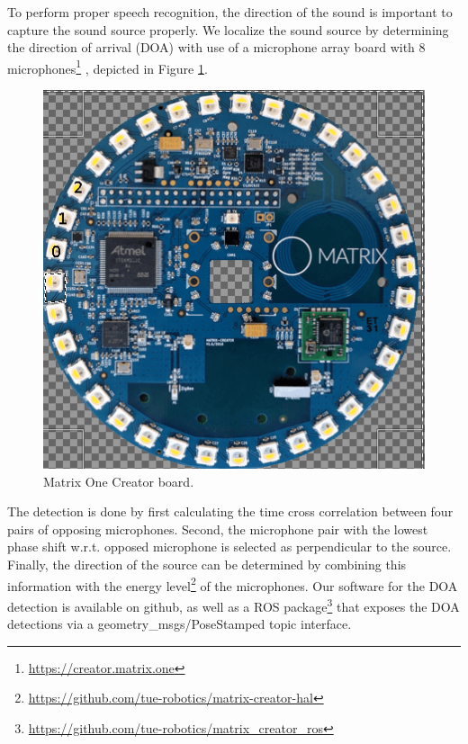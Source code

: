 To perform proper speech recognition, the direction of the sound is important to capture the sound source properly. We localize the sound source by determining the direction of arrival (DOA) with use of a microphone array board with 8 microphones\footnote{\url{https://creator.matrix.one}} , depicted in Figure \ref{fig:matrix_one}. 
\begin{figure}[h]
    \centering
	\includegraphics[width = 0.5\linewidth]{Figures/ssl_Matrix_creator.png}
	\caption{Matrix One Creator board.}
	\label{fig:matrix_one}
\end{figure}
The detection is done by first calculating the time cross correlation between four pairs of opposing microphones. Second, the microphone pair with the lowest phase shift w.r.t. opposed microphone is selected as perpendicular to the source. Finally, the direction of the source can be determined by combining this information with the energy level\footnote{\url{https://github.com/tue-robotics/matrix-creator-hal}} of the microphones. Our software for the DOA detection is available on github, as well as a ROS package\footnote{\url{https://github.com/tue-robotics/matrix_creator_ros}} that exposes the DOA detections via a geometry\_msgs/PoseStamped topic interface.